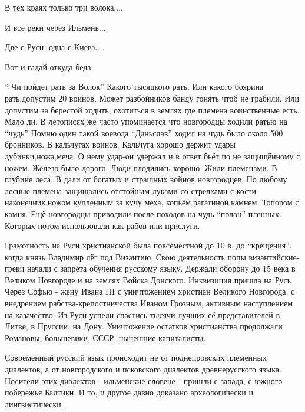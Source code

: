 \begin{itemize}

В тех краях только три волока....

И все реки через Ильмень...

Две с Руси, одна с Киева....

Вот и гадай откуда беда


\enquote{ Чи пойдет рать за Волок} Какого тысяцкого рать. Или какого боярина
рать.допустим 20 воинов. Может разбойников банду гонять чтоб не грабили. Или
допустим за берестой ходить, охотиться в землях где племена воинственные есть.
Мало ли. В летописях же часто упоминается что новгородцы ходили ратью на \enquote{чудь}
Помню один такой воевода \enquote{Даньслав} ходил на чудь было около 500 бронников. В
кальчугах воинов. Кальчуга хорошо держит удары дубинки,ножа,меча. О нему
удар-он удержал и в ответ бьёт по не защищённому с ножем. Железо было дорого.
Люди плодились хорошо. Жили племенами. В глубине леса. В дали от богатых и
страшных войнов новгородцев. По любому лесные племена защищались отстойным
луками со стрелками с кости наконечник,ножом купленным за кучу меха,
копьём.рагатиной,камнем. Топором с камня. Ещё новгородцы приводили после
походов на чудь \enquote{полон} пленных. Которых потом использовали как рабов или
прислуги.


Грамотность на Руси христианской была повсеместной до 10 в. до \enquote{крещения},
когда князь Владимир лёг под Византию. Свою деятельность попы
византийские-греки начали с запрета обучения русскому языку. Держали оборону до
15 века в Великом Новгороде и на землях Войска Донского. Инквизиция пришла на
Русь Через Софью - жену Ивана III с уничтожением христиан Великого Новгорода, с
внедрением рабства-крепостничества Иваном Грозным, активным наступлением на
казачество. Из Руси успели спастись тысячи лучших её представителей в Литве, в
Пруссии, на Дону. Уничтожение остатков христианства продолжали Романовы,
большевики, СССР, нынешние капиталисты.


Современный русский язык происходит не от поднепровских племенных диалектов, а
от новгородского и псковского диалектов древнерусского языка. Носители этих
диалектов - ильменские словене - пришли с запада, с южного побережья Балтики. И
то, и другое давно доказано археологически и лингвистически.



\end{itemize}
